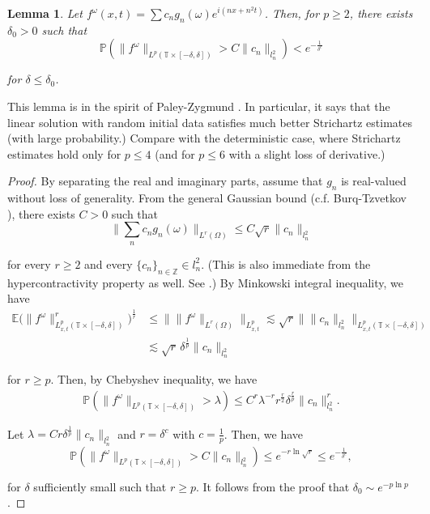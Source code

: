 \documentclass[11pt]{amsart}
\newtheorem{lemma}[theorem]{Lemma}
\numberwithin{equation}{section} \numberwithin{theorem}{section}
\begin{document}
\begin{lemma} \label{LEM:prob2} 
Let $f^\omega(x, t) = \sum c_n g_n(\omega) e^{i(nx + n^2t)} $. Then, for $p \geq 2$, there exists ${\delta}_0 > 0$ such that
	\[ \mathbb{P} ( \|f^\omega\|_{L^p(\mathbb{T}\times [-{\delta}, {\delta}])} > C\|c_n\|_{l^2_n} ) < e^{-\frac{1}{{\delta}^c} }\]
	
	{
\noindent} for ${\delta} \leq {\delta}_0$. 
\end{lemma}

{
\noindent}
This lemma is in the spirit of Paley-Zygmund \cite{PZ}.
In particular, it  says that the linear solution with random initial data
satisfies much better Strichartz estimates (with large probability.)
Compare with the deterministic case, where Strichartz estimates hold only for $p \leq 4$
(and for $p\leq 6$ with a slight loss of derivative.)

\begin{proof}
	By separating the real and imaginary parts, assume that $g_n$ is real-valued without loss of generality. From the general Gaussian bound (c.f. Burq-Tzvetkov \cite{Burq:2008p623}), there exists $C>0$ such that
	\[ \big\|\sum_n c_n g_n(\omega) \big\|_{L^r(\Omega)} \leq C \sqrt{r} \|c_n\|_{l^2_n}\]
	
	{
\noindent} for every $r \geq 2$ and every $\{c_n\}_{n \in \mathbb{Z}} \in l^2_n$. (This is also immediate from the hypercontractivity property as well. See \cite{Tzvetkov:2010p1443}.) By Minkowski integral inequality, we have 
	\begin{align*}
		\mathbb{E}\big( \|f^\omega\|_{L^p_{x, t}(\mathbb{T} \times [-{\delta}, {\delta}])}^r\big)^\frac{1}{r} &\leq \big\|\|f^\omega\|_{L^r(\Omega)}\big\|_{L^p_{x, t}} \lesssim \sqrt{r} \big\| \|c_n\|_{l^2_n} \big\|_{L^p_{x, t}(\mathbb{T} \times [-{\delta}, {\delta}])} \\
		&\lesssim \sqrt{r}\, {\delta}^\frac{1}{p} \|c_n\|_{l^2_n} 
	\end{align*}
	
	{
\noindent} for $r \geq p$. Then, by Chebyshev inequality, we have 
	\begin{align*}
		\mathbb{P} (\|f^\omega\|_{L^p(\mathbb{T} \times [-{\delta}, {\delta}])} > {\lambda} ) \leq C^r {\lambda}^{-r} r^\frac{r}{2} {\delta}^\frac{r}{p} \|c_n\|_{l^2_n}^r. 
	\end{align*}
	
	{
\noindent} Let ${\lambda} = C r {\delta}^\frac{1}{p} \|c_n\|_{l^2_n}$ 
	and $ r = {\delta}^{c}$ with $c = \frac{1}{p}$. Then, we have
	\[ \mathbb{P} (\|f^\omega\|_{L^p(\mathbb{T} \times [-{\delta}, {\delta}])} > C  \|c_n\|_{l^2_n} ) 
	\leq e^{-r \ln \sqrt{r}} \leq e^{-\frac{1}{{\delta}^{c}}},\]
	
	{
\noindent} for ${\delta}$ sufficiently small such that $ r \geq p$. 
It follows from the proof that ${\delta}_0 \sim e^{-p \ln p}$.
\end{proof}
\end{document}
